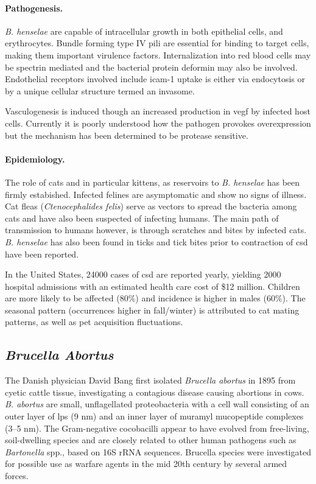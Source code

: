 \paragraph{Pathogenesis.}
\textit{B. henselae} are capable of intracellular growth in both epithelial cells, and erythrocytes. Bundle forming type IV pili are essential for binding to target cells, making them important virulence factors. Internalization into red blood cells may be spectrin mediated and the bacterial protein deformin may also be involved. Endothelial receptors involved include \gls{icam-1} uptake is either via endocytosis or by a unique cellular structure termed an invasome.

Vasculogenesis is induced though an increased production in \gls{vegf} by infected host cells. Currently it is poorly understood how the pathogen provokes overexpression but the mechanism has been determined to be protease sensitive.

\paragraph{Epidemiology.}
The role of cats and in particular kittens, as reservoirs to \textit{B. henselae} has been firmly estabished. Infected felines are asymptomatic and show no signs of illness. Cat fleas (\textit{Ctenocephalides felis}) serve as vectors to spread the bacteria among cats and have also been suspected of infecting humans. The main path of transmission to humans however, is through scratches and bites by infected cats. \textit{B. henselae} has also been found in ticks and tick bites prior to contraction of \gls{csd} have been reported.

In the United States, 24000 cases of \gls{csd} are reported yearly, yielding 2000 hospital admissions with an estimated health care cost of \$12 million. Children are more likely to be affected (80\%) and incidence is higher in males (60\%). The seasonal pattern (occurrences higher in fall/winter) is attributed to cat mating patterns, as well as pet acquisition fluctuations.

\subsection{\textit{Brucella Abortus}}

The Danish physician David Bang first isolated \textit{Brucella abortus} in 1895 from cyetic cattle tissue, investigating a contagious disease causing abortions in cows. \textit{B. abortus} are small, unflagellated proteobacteria with a cell wall consisting of an outer layer of \gls{lps} (9 nm) and an inner layer of muramyl mucopeptide complexes (3--5 nm). The Gram-negative cocobacilli appear to have evolved from free-living, soil-dwelling species and are closely related to other human pathogens such as \textit{Bartonella} spp., based on 16S rRNA sequences. Brucella species were investigated for possible use as warfare agents in the mid 20th century by several armed forces. \citep{Atluri2011}


